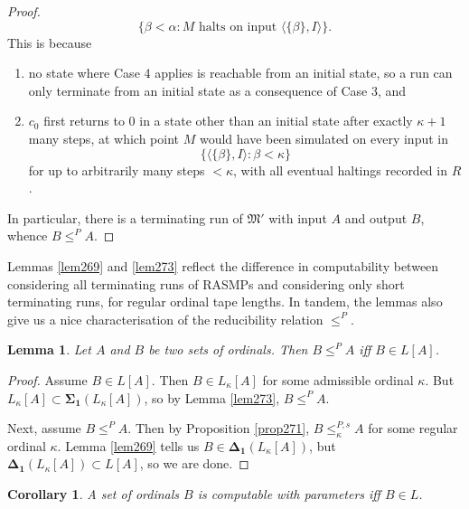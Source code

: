 \documentclass[12pt, twoside]{memoir}
\numberwithin{equation}{section}
\newtheorem{lem}[thm]{Lemma}
\newtheorem{cor}[thm]{Corollary}
\theoremstyle{definition}
\theoremstyle{remark}
\theoremstyle{definition}
\theoremstyle{definition}
\theoremstyle{definition}
\theoremstyle{remark}
\begin{document}
\begin{proof}
\begin{equation*}
    \{\beta < \alpha : M \text{ halts on input } \langle \{\beta\}, I \rangle\} \text{.}
\end{equation*}This is because
\begin{enumerate}[label=(\arabic*)]
    \item no state where Case 4 applies is reachable from an initial state, so a run can only terminate from an initial state as a consequence of Case 3, and
    \item $c_0$ first returns to $0$ in a state other than an initial state after exactly $\kappa + 1$ many steps, at which point $M$ would have been simulated on every input in 
    \begin{equation*}
        \{\langle \{\beta\}, I \rangle : \beta < \kappa\}
    \end{equation*}
    for up to arbitrarily many steps $< \kappa$, with all eventual haltings recorded in $R$.
\end{enumerate}
In particular, there is a terminating run of $\mathfrak{M}'$ with input $A$ and output $B$, whence $B \leq^P A$.
\end{proof}

Lemmas \ref{lem269} and \ref{lem273} reflect the difference in computability between considering all terminating runs of RASMPs and considering only short terminating runs, for regular ordinal tape lengths. In tandem, the lemmas also give us a nice characterisation of the reducibility relation $\leq^P$.

\begin{lem}\label{lem275}
Let $A$ and $B$ be two sets of ordinals. Then $B \leq^P A$ iff $B \in L[A]$.
\end{lem}

\begin{proof}
Assume $B \in L[A]$. Then $B \in L_{\kappa}[A]$ for some admissible ordinal $\kappa$. But $L_{\kappa}[A] \subset \mathbf{\Sigma_1}(L_{\kappa}[A])$, so by Lemma \ref{lem273}, $B \leq^P A$. 

Next, assume $B \leq^P A$. Then by Proposition \ref{prop271}, $B \leq^{P, s}_{\kappa} A$ for some regular ordinal $\kappa$. Lemma \ref{lem269} tells us $B \in \mathbf{\Delta_1}(L_{\kappa}[A])$, but $\mathbf{\Delta_1}(L_{\kappa}[A]) \subset L[A]$, so we are done.
\end{proof}

\begin{cor}
A set of ordinals $B$ is computable with parameters iff $B \in L$.
\end{cor}
\end{document}
